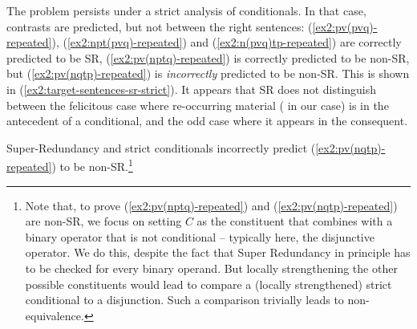 The problem persists under a strict analysis of conditionals. In that case, contrasts are predicted, but not between the right sentences: (\ref{ex2:pv(pvq)-repeated}), (\ref{ex2:npt(pvq)-repeated}) and (\ref{ex2:n(pvq)tp-repeated}) are correctly predicted to be SR, (\ref{ex2:pv(nptq)-repeated}) is correctly predicted to be non-SR, but (\ref{ex2:pv(nqtp)-repeated}) is \textit{incorrectly} predicted to be non-SR. This is shown in (\ref{ex2:target-sentences-sr-strict}). It appears that SR does not distinguish between the felicitous case where re-occurring material (\p{} in our case) is in the antecedent of a conditional, and the odd case where it appears in the consequent.

\begin{exe}
	\ex Super-Redundancy and strict conditionals incorrectly predict (\ref{ex2:pv(nqtp)-repeated}) to be non-SR.\footnote{Note that, to prove (\ref{ex2:pv(nptq)-repeated}) and (\ref{ex2:pv(nqtp)-repeated}) are non-SR, we focus on setting $C$ as the constituent that combines with a binary operator that is not conditional -- typically here, the disjunctive operator. We do this, despite the fact that Super Redundancy in principle has to be checked for every binary operand. But locally strengthening the other possible constituents would lead to compare a (locally strengthened) strict conditional to a disjunction. Such a comparison trivially leads to non-equivalence.} \label{ex2:target-sentences-sr-strict}
	\begin{xlist}
		\label{ex2:npt(pvq)-repeated-sr-strict}
\end{xlist}
\end{exe}
